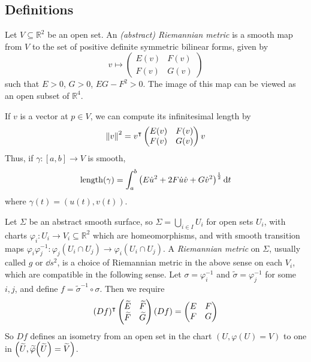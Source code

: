 \subsection{Definitions}
\begin{definition}
	Let \( V \subseteq \mathbb R^2 \) be an open set.
	An \textit{(abstract) Riemannian metric} is a smooth map from \( V \) to the set of positive definite symmetric bilinear forms, given by
	\[
		v \mapsto \begin{pmatrix}
			E(v) & F(v) \\
			F(v) & G(v)
		\end{pmatrix}
	\]
	such that \( E > 0 \), \( G > 0 \), \( EG - F^2 > 0 \).
	The image of this map can be viewed as an open subset of \( \mathbb R^4 \).
\end{definition}
If \( v \) is a vector at \( p \in V \), we can compute its infinitesimal length by
\[
	\norm{v}^2 = v^\intercal \begin{pmatrix}
		E(v) & F(v) \\
		F(v) & G(v)
	\end{pmatrix} v
\]
Thus, if \( \gamma \colon [a,b] \to V \) is smooth,
\[
	\mathrm{length}(\gamma) = \int_a^b \qty( E \dot u^2 + 2F \dot u \dot v + G \dot v^2 )^{\frac{1}{2}} \dd{t}
\]
where \( \gamma(t) = (u(t),v(t)) \).
\begin{definition}
	Let \( \Sigma \) be an abstract smooth surface, so \( \Sigma = \bigcup_{i \in I} U_i \) for open sets \( U_i \), with charts \( \varphi_i \colon U_i \to V_i \subseteq \mathbb R^2 \) which are homeomorphisms, and with smooth transition maps \( \varphi_i \varphi_j^{-1} \colon \varphi_j(U_i \cap U_j) \to \varphi_i(U_i \cap U_j) \).
	A \textit{Riemannian metric} on \( \Sigma \), usually called \( g \) or \( \dd{s}^2 \), is a choice of Riemannian metric in the above sense on each \( V_i \), which are compatible in the following sense.
	Let \( \sigma = \varphi_i^{-1} \) and \( \widetilde \sigma = \varphi_j^{-1} \) for some \( i,j \), and define \( f = \widetilde \sigma^{-1} \circ \sigma \).
	Then we require
	\[
		(Df)^\intercal \begin{pmatrix}
			\widetilde E & \widetilde F \\
			\widetilde F & \widetilde G
		\end{pmatrix} (Df) = \begin{pmatrix}
			E & F \\
			F & G
		\end{pmatrix}
	\]
	So \( Df \) defines an isometry from an open set in the chart \( (U, \varphi(U) = V) \) to one in \( \qty(\widetilde U, \widetilde \varphi\qty(\widetilde U) = \widetilde V) \).
\end{definition}

